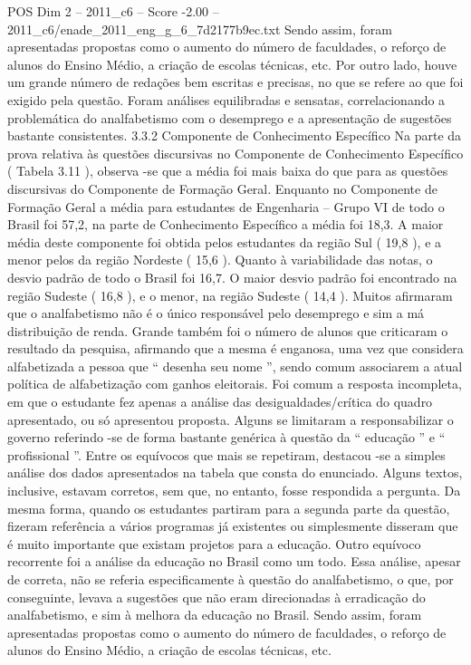 \begin{textsample}{POS Dim 2 – 2011\_c6 – Score -2.00 – 2011\_c6/enade\_2011\_eng\_g\_6\_7d2177b9ec.txt}
Sendo assim, foram apresentadas propostas como o aumento do número de faculdades, o reforço de alunos do Ensino Médio, a criação de escolas técnicas, etc.
Por outro lado, houve um grande número de redações bem escritas e precisas, no que se refere ao que foi exigido pela questão.
Foram análises equilibradas e sensatas, correlacionando a problemática do analfabetismo com o desemprego e a apresentação de sugestões bastante consistentes. 3.3.2 Componente de Conhecimento Específico Na parte da prova relativa às questões discursivas no Componente de Conhecimento Específico ( Tabela 3.11 ), observa -se que a média foi mais baixa do que para as questões discursivas do Componente de Formação Geral.
Enquanto no Componente de Formação Geral a média para estudantes de Engenharia – Grupo VI de todo o Brasil foi 57,2, na parte de Conhecimento Específico a média foi 18,3.
A maior média deste componente foi obtida pelos estudantes da região Sul ( 19,8 ), e a menor pelos da região Nordeste ( 15,6 ).
Quanto à variabilidade das notas, o desvio padrão de todo o Brasil foi 16,7.
O maior desvio padrão foi encontrado na região Sudeste ( 16,8 ), e o menor, na região Sudeste ( 14,4 ).
Muitos afirmaram que o analfabetismo não é o único responsável pelo desemprego e sim a má distribuição de renda.
Grande também foi o número de alunos que criticaram o resultado da pesquisa, afirmando que a mesma é enganosa, uma vez que considera alfabetizada a pessoa que “ desenha seu nome ”, sendo comum associarem a atual política de alfabetização com ganhos eleitorais.
Foi comum a resposta incompleta, em que o estudante fez apenas a análise das desigualdades/crítica do quadro apresentado, ou só apresentou proposta.
Alguns se limitaram a responsabilizar o governo referindo -se de forma bastante genérica à questão da “ educação ” e “ profissional ”.
Entre os equívocos que mais se repetiram, destacou -se a simples análise dos dados apresentados na tabela que consta do enunciado.
Alguns textos, inclusive, estavam corretos, sem que, no entanto, fosse respondida a pergunta.
Da mesma forma, quando os estudantes partiram para a segunda parte da questão, fizeram referência a vários programas já existentes ou simplesmente disseram que é muito importante que existam projetos para a educação.
Outro equívoco recorrente foi a análise da educação no Brasil como um todo.
Essa análise, apesar de correta, não se referia especificamente à questão do analfabetismo, o que, por conseguinte, levava a sugestões que não eram direcionadas à erradicação do analfabetismo, e sim à melhora da educação no Brasil.
Sendo assim, foram apresentadas propostas como o aumento do número de faculdades, o reforço de alunos do Ensino Médio, a criação de escolas técnicas, etc.

\end{textsample}
